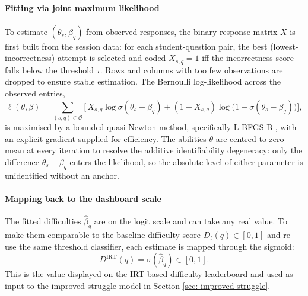 \paragraph{Fitting via joint maximum likelihood}
To estimate $(\theta_s, \beta_q)$ from observed responses, the binary response matrix $X$ is first built from the session data: for each student-question pair, the best (lowest-incorrectness) attempt is selected and coded $X_{s,q} = 1$ iff the incorrectness score falls below the threshold $\tau$. Rows and columns with too few observations are dropped to ensure stable estimation. The Bernoulli log-likelihood across the observed entries,
\begin{equation}
    \ell(\theta, \beta)
    = \sum_{(s, q) \in \mathcal{O}}
      \Big[\, X_{s,q} \log \sigma(\theta_s - \beta_q)
          + (1 - X_{s,q}) \log \big(1 - \sigma(\theta_s - \beta_q)\big) \Big],
    \label{eq:rasch-loglik}
\end{equation}
is maximised by a bounded quasi-Newton method, specifically L-BFGS-B \cite{byrdLimitedMemoryAlgorithm1995}, with an explicit gradient supplied for efficiency. The abilities $\theta$ are centred to zero mean at every iteration to resolve the additive identifiability degeneracy: only the difference $\theta_s - \beta_q$ enters the likelihood, so the absolute level of either parameter is unidentified without an anchor.

\paragraph{Mapping back to the dashboard scale}
The fitted difficulties $\hat{\beta}_q$ are on the logit scale and can take any real value. 
To make them comparable to the baseline difficulty score $D_t(q) \in [0,1]$ and re-use the same threshold classifier, each estimate is mapped through the sigmoid:
\begin{equation}
    D^{\mathrm{IRT}}(q) = \sigma(\hat{\beta}_q) \in [0, 1].
    \label{eq:irt-difficulty}
\end{equation}
This is the value displayed on the IRT-based difficulty leaderboard and used as input to the improved struggle model in 
Section \ref{sec: improved struggle}. 


